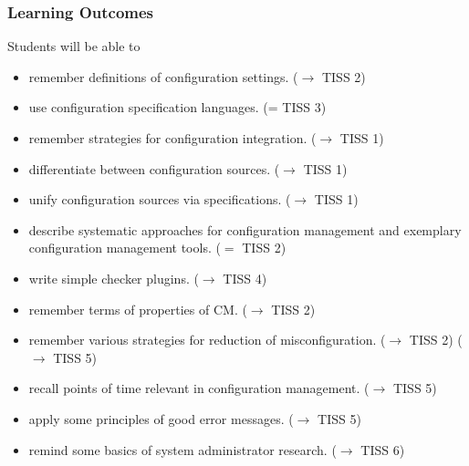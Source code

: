 \begin{frame}
	\footnotesize
	\frametitle{Learning Outcomes}
	Students will be able to

	\begin{itemize}
	\item remember definitions of configuration settings.
	($\rightarrow$ TISS 2)

	\item use configuration specification languages.
	(= TISS 3)

	\item remember strategies for configuration integration.
	($\rightarrow$ TISS 1)

	\item differentiate between configuration sources.
	($\rightarrow$ TISS 1)
	\item unify configuration sources via specifications.
	($\rightarrow$ TISS 1)

	\item describe systematic approaches for configuration management and exemplary configuration management tools.
	($=$ TISS 2)

	\item {\color{gray} write simple checker plugins.}
	($\rightarrow$ TISS 4)

	\item remember terms of properties of CM.
	($\rightarrow$ TISS 2)
	\item remember various strategies for reduction of misconfiguration.
	($\rightarrow$ TISS 2)
	($\rightarrow$ TISS 5)

	\item recall points of time relevant in configuration management.
	($\rightarrow$ TISS 5)

	\item apply some principles of good error messages.
	($\rightarrow$ TISS 5)
	\item remind some basics of system administrator research.
	($\rightarrow$ TISS 6)


\end{itemize}
\end{frame}
